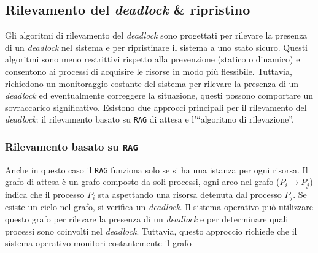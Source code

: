     \subsection{Rilevamento del \textit{deadlock} \& ripristino}
        Gli algoritmi di rilevamento del \textit{deadlock} sono progettati per rilevare la presenza di un \textit{deadlock} nel sistema e per ripristinare il sistema a uno stato sicuro. Questi algoritmi sono meno restrittivi rispetto alla prevenzione (statico o dinamico) e consentono ai processi di acquisire le risorse in modo più flessibile. Tuttavia, richiedono un monitoraggio costante del sistema per rilevare la presenza di un \textit{deadlock} ed eventualmente correggere la situazione, questi possono comportare un sovraccarico significativo.\newline
        Esistono due approcci principali per il rilevamento del \textit{deadlock}: il rilevamento basato su \texttt{RAG} di attesa e l'``algoritmo di rilevazione''.
        \subsubsection{Rilevamento basato su \texttt{RAG}}
            Anche in questo caso il \texttt{RAG} funziona solo se si ha una istanza per ogni risorsa. Il grafo di attesa è un grafo composto da soli processi, ogni arco nel grafo ($P_i\rightarrow P_j$) indica che il processo $P_i$ sta aspettando una risorsa detenuta dal processo $P_j$. Se esiste un ciclo nel grafo, si verifica un \textit{deadlock}. Il sistema operativo può utilizzare questo grafo per rilevare la presenza di un \textit{deadlock} e per determinare quali processi sono coinvolti nel \textit{deadlock}. Tuttavia, questo approccio richiede che il sistema operativo monitori costantemente il grafo
